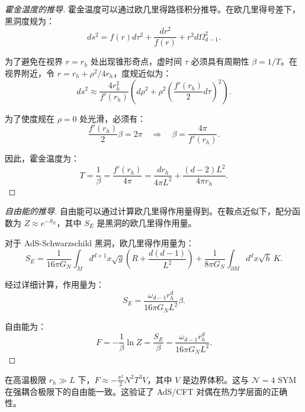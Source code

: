 \begin{proof}[霍金温度的推导]
霍金温度可以通过欧几里得路径积分推导。在欧几里得号差下，黑洞度规为：
\begin{equation}
    ds^2 = f(r) d\tau^2 + \frac{dr^2}{f(r)} + r^2 d\Omega_{d-1}^2.
\end{equation}

为了避免在视界 $r = r_h$ 处出现锥形奇点，虚时间 $\tau$ 必须具有周期性 $\beta = 1/T$。在视界附近，令 $r = r_h + \rho^2/4r_h$，度规近似为：
\begin{equation}
    ds^2 \approx \frac{4r_h^2}{f'(r_h)} \left( d\rho^2 + \rho^2 \left(\frac{f'(r_h)}{2} d\tau\right)^2 \right).
\end{equation}

为了使度规在 $\rho = 0$ 处光滑，必须有：
\begin{equation}
    \frac{f'(r_h)}{2} \beta = 2\pi \quad \Rightarrow \quad \beta = \frac{4\pi}{f'(r_h)}.
\end{equation}

因此，霍金温度为：
\begin{equation}
    T = \frac{1}{\beta} = \frac{f'(r_h)}{4\pi} = \frac{d r_h}{4\pi L^2} + \frac{(d-2) L^2}{4\pi r_h}.
\end{equation}
\end{proof}

\begin{proof}[自由能的推导]
自由能可以通过计算欧几里得作用量得到。在鞍点近似下，配分函数为 $Z \approx e^{-S_E}$，其中 $S_E$ 是黑洞的欧几里得作用量。

对于 AdS-Schwarzschild 黑洞，欧几里得作用量为：
\begin{equation}
    S_E = \frac{1}{16\pi G_N} \int_M d^{d+1}x \sqrt{g} \left( R + \frac{d(d-1)}{L^2} \right) + \frac{1}{8\pi G_N} \int_{\partial M} d^d x \sqrt{h} \, K.
\end{equation}

经过详细计算，作用量为：
\begin{equation}
    S_E = \frac{\omega_{d-1} r_h^d}{16\pi G_N L^2} \beta.
\end{equation}

自由能为：
\begin{equation}
    F = -\frac{1}{\beta} \ln Z = \frac{S_E}{\beta} = \frac{\omega_{d-1} r_h^d}{16\pi G_N L^2}.
\end{equation}
\end{proof}

\begin{note}
在高温极限 $r_h \gg L$ 下，$F \approx -\frac{\pi^2}{2} N^2 T^3 V$，其中 $V$ 是边界体积。这与 $\mathcal{N}=4$ SYM 在强耦合极限下的自由能一致。这验证了 AdS/CFT 对偶在热力学层面的正确性。
\end{note}

